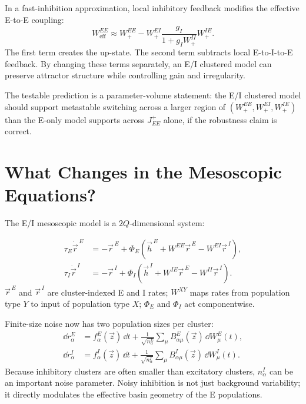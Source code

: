 In a fast-inhibition approximation, local inhibitory feedback modifies the effective E-to-E coupling:
%
\begin{equation}
  W_{\mathrm{eff}}^{EE}
  \approx
  W_{+}^{EE}
  -
  W_{+}^{EI}
  \frac{g_I}{1+g_I W_{+}^{II}}
  W_{+}^{IE}.
  \label{eq:local-effective-ee}
\end{equation}
%
The first term creates the up-state. The second term subtracts local E-to-I-to-E feedback. By changing these terms separately, an E/I clustered model can preserve attractor structure while controlling gain and irregularity.

The testable prediction is a parameter-volume statement: the E/I clustered model should support metastable switching across a larger region of $(W_{+}^{EE},W_{+}^{EI},W_{+}^{IE})$ than the E-only model supports across $J_{EE}^{+}$ alone, if the robustness claim is correct.

\section{What Changes in the Mesoscopic Equations?}
\label{sec:what-changes-in-mesoscopic-equations}

The E/I mesoscopic model is a $2Q$-dimensional system:
%
\begin{keyequation}
\begin{align}
  \tau_E \dot{\vec r}^{\,E}
  &=
  -\vec r^{\,E}
  +
  \Phi_E\!\left(
    \vec h^{\,E}
    +
    W^{EE}\vec r^{\,E}
    -
    W^{EI}\vec r^{\,I}
  \right),
  \label{eq:ei-vector-e}\\
  \tau_I \dot{\vec r}^{\,I}
  &=
  -\vec r^{\,I}
  +
  \Phi_I\!\left(
    \vec h^{\,I}
    +
    W^{IE}\vec r^{\,E}
    -
    W^{II}\vec r^{\,I}
  \right).
  \label{eq:ei-vector-i}
\end{align}
\tcblower
$\vec r^{\,E}$ and $\vec r^{\,I}$ are cluster-indexed E and I rates; $W^{XY}$ maps rates from population type $Y$ to input of population type $X$; $\Phi_E$ and $\Phi_I$ act componentwise.
\end{keyequation}

\noindent Finite-size noise now has two population sizes per cluster:
%
\begin{align}
  \dd r_{\alpha}^{E}
  &=
  f_{\alpha}^{E}(\vec z)\,\dd t
  +
  \frac{1}{\sqrt{n_{\alpha}^{E}}}
  \sum_{\mu}B_{\alpha\mu}^{E}(\vec z)\,\dd W_{\mu}^{E}(t),
  \label{eq:ei-noise-e}\\
  \dd r_{\alpha}^{I}
  &=
  f_{\alpha}^{I}(\vec z)\,\dd t
  +
  \frac{1}{\sqrt{n_{\alpha}^{I}}}
  \sum_{\mu}B_{\alpha\mu}^{I}(\vec z)\,\dd W_{\mu}^{I}(t).
  \label{eq:ei-noise-i}
\end{align}
%
Because inhibitory clusters are often smaller than excitatory clusters, $n_{\alpha}^{I}$ can be an important noise parameter. Noisy inhibition is not just background variability; it directly modulates the effective basin geometry of the E populations.

